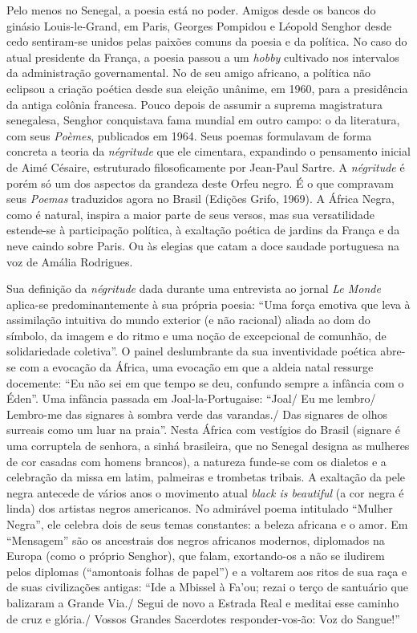 \documentclass[
  letterpaper,
  DIV=11,
  numbers=noendperiod]{scrreprt}
\begin{document}
Pelo menos no Senegal, a poesia está no poder. Amigos desde os bancos do
ginásio Louis-le-Grand, em Paris, Georges Pompidou e Léopold Senghor
desde cedo sentiram-se unidos pelas paixões comuns da poesia e da
política. No caso do atual presidente da França, a poesia passou a um
\emph{hobby} cultivado nos intervalos da administração governamental. No
de seu amigo africano, a política não eclipsou a criação poética desde
sua eleição unânime, em 1960, para a presidência da antiga colônia
francesa. Pouco depois de assumir a suprema magistratura senegalesa,
Senghor conquistava fama mundial em outro campo: o da literatura, com
seus \emph{Poèmes}, publicados em 1964. Seus poemas formulavam de forma
concreta a teoria da \emph{négritude} que ele cimentara, expandindo o
pensamento inicial de Aimé Césaire, estruturado filosoficamente por
Jean-Paul Sartre. A \emph{négritude} é porém só um dos aspectos da
grandeza deste Orfeu negro. É o que compravam seus \emph{Poemas}
traduzidos agora no Brasil (Edições Grifo, 1969). A África Negra, como é
natural, inspira a maior parte de seus versos, mas sua versatilidade
estende-se à participação política, à exaltação poética de jardins da
França e da neve caindo sobre Paris. Ou às elegias que catam a doce
saudade portuguesa na voz de Amália Rodrigues.

Sua definição da \emph{négritude} dada durante uma entrevista ao jornal
\emph{Le Monde} aplica-se predominantemente à sua própria poesia: ``Uma
força emotiva que leva à assimilação intuitiva do mundo exterior (e não
racional) aliada ao dom do símbolo, da imagem e do ritmo e uma noção de
excepcional de comunhão, de solidariedade coletiva''. O painel
deslumbrante da sua inventividade poética abre-se com a evocação da
África, uma evocação em que a aldeia natal ressurge docemente: ``Eu não
sei em que tempo se deu, confundo sempre a infância com o Éden''. Uma
infância passada em Joal-la-Portugaise: ``Joal/ Eu me lembro/ Lembro-me
das signares à sombra verde das varandas./ Das signares de olhos
surreais como um luar na praia''. Nesta África com vestígios do Brasil
(signare é uma corruptela de senhora, a sinhá brasileira, que no Senegal
designa as mulheres de cor casadas com homens brancos), a natureza
funde-se com os dialetos e a celebração da missa em latim, palmeiras e
trombetas tribais. A exaltação da pele negra antecede de vários anos o
movimento atual \emph{black is beautiful} (a cor negra é linda) dos
artistas negros americanos. No admirável poema intitulado ``Mulher
Negra'', ele celebra dois de seus temas constantes: a beleza africana e
o amor. Em ``Mensagem'' são os ancestrais dos negros africanos modernos,
diplomados na Europa (como o próprio Senghor), que falam, exortando-os a
não se iludirem pelos diplomas (``amontoais folhas de papel'') e a
voltarem aos ritos de sua raça e de suas civilizações antigas: ``Ide a
Mbissel à Fa'ou; rezai o terço de santuário que balizaram a Grande Via./
Segui de novo a Estrada Real e meditai esse caminho de cruz e glória./
Vossos Grandes Sacerdotes responder-vos-ão: Voz do Sangue!''
\end{document}

